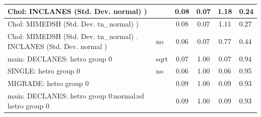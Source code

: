 \begin{table}
\begin{center}
\begin{tabular}{|l|l|c|c|c|l|}
			\hline
			 Chol: INCLANES (Std. Dev. normal) ) &  & 0.08 & 0.07 & 1.18 & 0.24 \\
			\hline
			 Chol: MIMEDSH (Std. Dev. tn_normal) ) &  & 0.08 & 0.07 & 1.11 & 0.27 \\
			\hline
			 Chol: MIMEDSH (Std. Dev. tn_normal) . INCLANES (Std. Dev.   normal ) & no & 0.06 & 0.07 & 0.77 & 0.44 \\
			\hline
			main: DECLANES: hetro group 0 & sqrt & 0.07 & 1.00 & 0.07 & 0.94 \\
			\hline
			SINGLE: hetro group 0 & no & 0.06 & 1.00 & 0.06 & 0.95 \\
			\hline
			MIGRADE: hetro group 0 &  & 0.09 & 1.00 & 0.09 & 0.93 \\
			\hline
			main: DECLANES: hetro group 0:normal:sd  hetro group 0 &  & 0.09 & 1.00 & 0.09 & 0.93 \\
			\hline
		\end{tabular}
	\end{center}
\end{table}